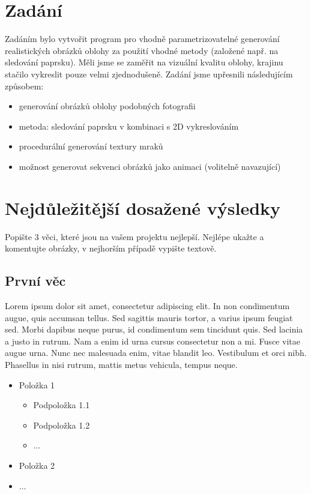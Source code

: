 \documentclass[12pt,a4paper,titlepage,final]{report}
\begin{document}
\chapter{Zadání}

Zadáním bylo vytvořit program pro vhodně parametrizovatelné generování realistických obrázků oblohy za použití vhodné metody (založené např. na sledování paprsku). Měli jsme se zaměřit na vizuální kvalitu oblohy, krajinu stačilo vykreslit pouze velmi zjednodušeně. Zadání jsme upřesnili následujícím způsobem:

\begin{itemize}
    \item generování obrázků oblohy podobných fotografii
    \item metoda: sledování paprsku v kombinaci s 2D vykreslováním
    \item procedurální generování textury mraků
    \item možnost generovat sekvenci obrázků jako animaci (volitelně navazující)
\end{itemize}

\chapter{Nejdůležitější dosažené výsledky}

Popište 3 věci, které jsou na vašem projektu nejlepší. Nejlépe ukažte a
komentujte obrázky, v nejhorším případě vypište textově.

\section{První věc}

Lorem ipsum dolor sit amet, consectetur adipiscing elit. In non condimentum augue, quis accumsan tellus. Sed sagittis mauris tortor, a varius ipsum feugiat sed. Morbi dapibus neque purus, id condimentum sem tincidunt quis. Sed lacinia a justo in rutrum. Nam a enim id urna cursus consectetur non a mi. Fusce vitae augue urna. Nunc nec malesuada enim, vitae blandit leo. Vestibulum et orci nibh. Phasellus in nisi rutrum, mattis metus vehicula, tempus neque.

\begin{itemize}
    \item Položka 1
    \begin{itemize}
        \item Podpoložka 1.1
        \item Podpoložka 1.2
        \item $\ldots$
    \end{itemize}
    \item Položka 2
    \item $\ldots$
\end{itemize}
\end{document}
